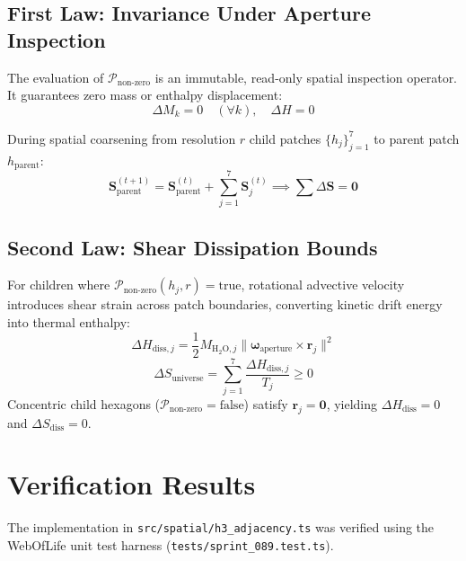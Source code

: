 \documentclass[10pt,journal,compsoc]{IEEEtran}
\begin{document}
\subsection{First Law: Invariance Under Aperture Inspection}
The evaluation of $\mathcal{P}_{\text{non-zero}}$ is an immutable, read-only spatial inspection operator. It guarantees zero mass or enthalpy displacement:
\begin{equation}
\Delta M_k = 0 \quad (\forall k), \quad \Delta H = 0
\end{equation}

During spatial coarsening from resolution $r$ child patches $\{h_j\}_{j=1}^7$ to parent patch $h_{\text{parent}}$:
\begin{equation}
\mathbf{S}_{\text{parent}}^{(t+1)} = \mathbf{S}_{\text{parent}}^{(t)} + \sum_{j=1}^7 \mathbf{S}_{j}^{(t)} \implies \sum \Delta \mathbf{S} = \mathbf{0}
\end{equation}

\subsection{Second Law: Shear Dissipation Bounds}
For children where $\mathcal{P}_{\text{non-zero}}(h_j, r) = \text{true}$, rotational advective velocity introduces shear strain across patch boundaries, converting kinetic drift energy into thermal enthalpy:
\begin{equation}
\Delta H_{\text{diss}, j} = \frac{1}{2} M_{\text{H}_2\text{O}, j} \|\boldsymbol{\omega}_{\text{aperture}} \times \mathbf{r}_j\|^2
\end{equation}
\begin{equation}
\Delta S_{\text{universe}} = \sum_{j=1}^7 \frac{\Delta H_{\text{diss}, j}}{T_j} \ge 0
\end{equation}
Concentric child hexagons ($\mathcal{P}_{\text{non-zero}} = \text{false}$) satisfy $\mathbf{r}_j = \mathbf{0}$, yielding $\Delta H_{\text{diss}} = 0$ and $\Delta S_{\text{diss}} = 0$.

\section{Verification Results}

The implementation in \texttt{src/spatial/h3\_adjacency.ts} was verified using the WebOfLife unit test harness (\texttt{tests/sprint\_089.test.ts}).
\end{document}

